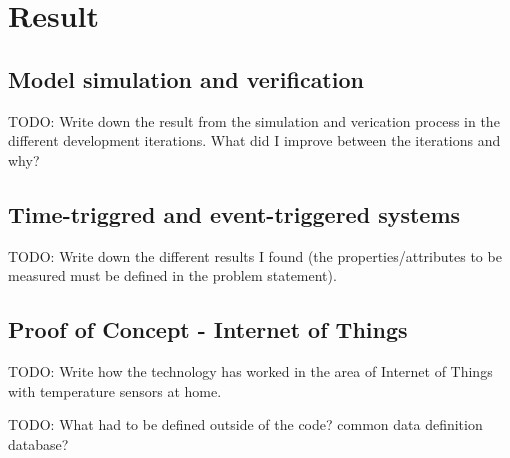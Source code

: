 \chapter{Result}
\section{Model simulation and verification}
TODO: Write down the result from the simulation and verication process in the
different development iterations. What did I improve between the iterations and
why?

\section{Time-triggred and event-triggered systems}
TODO: Write down the different results I found (the properties/attributes to be
measured must be defined in the problem statement).

\section{Proof of Concept - Internet of Things}
TODO: Write how the technology has worked in the area of Internet of Things
with temperature sensors at home.

TODO: What had to be defined outside of the code? common data definition
database?
